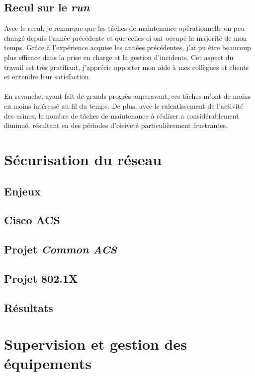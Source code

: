 \documentclass[a4paper,12pt]{report}
\begin{document}
\subsection{Recul sur le \textit{run}}
Avec le recul, je remarque que les tâches de maintenance opérationnelle on peu changé depuis l'année précédente et que celles-ci ont occupé la majorité de mon temps. Grâce à l'expérience acquise les années précédentes, j'ai pu être beaucoup plus efficace dans la prise en charge et la gestion d'incidents. Cet aspect du travail est très gratifiant, j'apprécie apporter mon aide à mes collègues et clients et entendre leur satisfaction.
\paragraph{}
En revanche, ayant fait de grands progrès auparavant, ces tâches m'ont de moins en moins intéressé au fil du temps. De plus, avec le ralentissement de l'activité des usines, le nombre de tâches de maintenance à réaliser a considérablement diminué, résultant en des périodes d'oisiveté particulièrement frustrantes.

\section{Sécurisation du réseau}
\subsection{Enjeux}
\subsection{Cisco ACS}
\subsection{Projet \textit{Common ACS}}
\subsection{Projet 802.1X} %
\subsection{Résultats}%
\section{Supervision et gestion des équipements}
\end{document}
